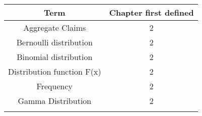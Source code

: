 \documentclass[]{book}
\theoremstyle{definition}
\theoremstyle{definition}
\theoremstyle{definition}
\theoremstyle{remark}
\begin{document}
\begin{longtable}[]{@{}cc@{}}
\toprule
\begin{minipage}[b]{0.43\columnwidth}\centering\strut
Term\strut
\end{minipage} & \begin{minipage}[b]{0.30\columnwidth}\centering\strut
Chapter first defined\strut
\end{minipage}\tabularnewline
\midrule
\endhead
\begin{minipage}[t]{0.43\columnwidth}\centering\strut
Aggregate Claims\strut
\end{minipage} & \begin{minipage}[t]{0.30\columnwidth}\centering\strut
2\strut
\end{minipage}\tabularnewline
\begin{minipage}[t]{0.43\columnwidth}\centering\strut
Bernoulli distribution\strut
\end{minipage} & \begin{minipage}[t]{0.30\columnwidth}\centering\strut
2\strut
\end{minipage}\tabularnewline
\begin{minipage}[t]{0.43\columnwidth}\centering\strut
Binomial distribution\strut
\end{minipage} & \begin{minipage}[t]{0.30\columnwidth}\centering\strut
2\strut
\end{minipage}\tabularnewline
\begin{minipage}[t]{0.43\columnwidth}\centering\strut
Distribution function F(x)\strut
\end{minipage} & \begin{minipage}[t]{0.30\columnwidth}\centering\strut
2\strut
\end{minipage}\tabularnewline
\begin{minipage}[t]{0.43\columnwidth}\centering\strut
Frequency\strut
\end{minipage} & \begin{minipage}[t]{0.30\columnwidth}\centering\strut
2\strut
\end{minipage}\tabularnewline
\begin{minipage}[t]{0.43\columnwidth}\centering\strut
Gamma Distribution\strut
\end{minipage} & \begin{minipage}[t]{0.30\columnwidth}\centering\strut
2\strut
\end{minipage}\tabularnewline
\begin{minipage}[t]{0.43\columnwidth}\centering\strut

\end{minipage}
\end{longtable}
\end{document}
